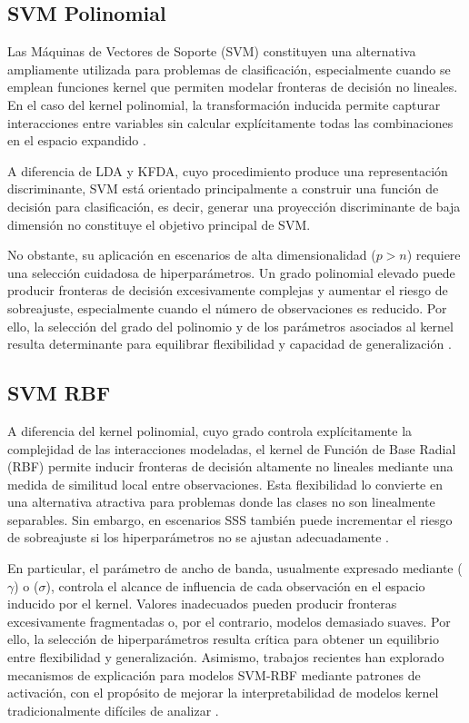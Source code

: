 \subsection{SVM Polinomial}

Las Máquinas de Vectores de Soporte (SVM) constituyen una alternativa ampliamente utilizada para problemas de clasificación, especialmente cuando se emplean funciones kernel que permiten modelar fronteras de decisión no lineales. En el caso del kernel polinomial, la transformación inducida permite capturar interacciones entre variables sin calcular explícitamente todas las combinaciones en el espacio expandido \cite{scholkopf2001learning}.

A diferencia de LDA y KFDA, cuyo procedimiento produce una representación discriminante, SVM está orientado principalmente a construir una función de decisión para clasificación, es decir, generar una proyección discriminante de baja dimensión no constituye el objetivo principal de SVM.

No obstante, su aplicación en escenarios de alta dimensionalidad ($p>n$) requiere una selección cuidadosa de hiperparámetros. Un grado polinomial elevado puede producir fronteras de decisión excesivamente complejas y aumentar el riesgo de sobreajuste, especialmente cuando el número de observaciones es reducido. Por ello, la selección del grado del polinomio y de los parámetros asociados al kernel resulta determinante para equilibrar flexibilidad y capacidad de generalización \cite{jalili2025performance}.


\subsection{SVM RBF}

A diferencia del kernel polinomial, cuyo grado controla explícitamente la complejidad de las interacciones modeladas, el kernel de Función de Base Radial (RBF) permite inducir fronteras de decisión altamente no lineales mediante una medida de similitud local entre observaciones. Esta flexibilidad lo convierte en una alternativa atractiva para problemas donde las clases no son linealmente separables. Sin embargo, en escenarios SSS también puede incrementar el riesgo de sobreajuste si los hiperparámetros no se ajustan adecuadamente \cite{remaki2026rbf}.

En particular, el parámetro de ancho de banda, usualmente expresado mediante ($\gamma$) o ($\sigma$), controla el alcance de influencia de cada observación en el espacio inducido por el kernel. Valores inadecuados pueden producir fronteras excesivamente fragmentadas o, por el contrario, modelos demasiado suaves. Por ello, la selección de hiperparámetros resulta crítica para obtener un equilibrio entre flexibilidad y generalización. Asimismo, trabajos recientes han explorado mecanismos de explicación para modelos SVM-RBF mediante patrones de activación, con el propósito de mejorar la interpretabilidad de modelos kernel tradicionalmente difíciles de analizar \cite{zhang2024fast}.

